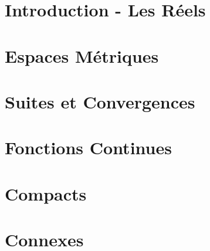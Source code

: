



\chapter{Introduction - Les Réels}


\chapter{Espaces Métriques}


\chapter{Suites et Convergences}


\chapter{Fonctions Continues}


\chapter{Compacts}


\chapter{Connexes}


% 
